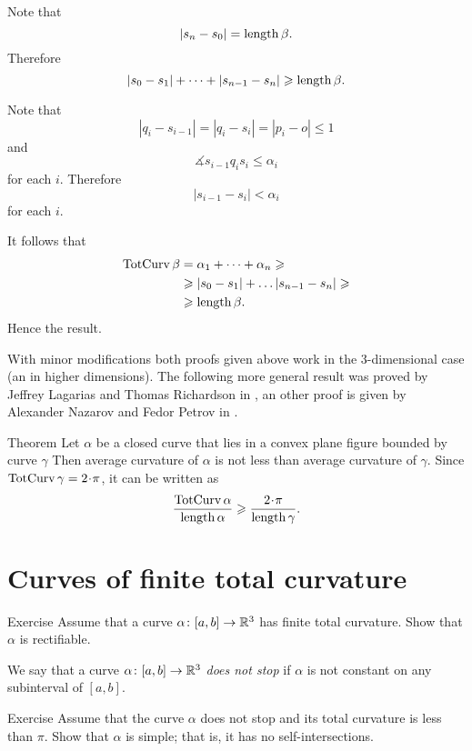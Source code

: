 Note that 
\[|s_n-s_0|=\mathop{\rm length}\nolimits \beta.\]
Therefore 
\[|s_0-s_1|+\dots+|s_{n-1}-s_n|\geqslant \mathop{\rm length}\nolimits \beta.\]

Note that 
\[|q_i-s_{i-1}|=|q_i-s_i|=|p_i-o|\le 1\]
and
\[\measuredangle s_{i-1}q_is_i\le \alpha_i\]
for each $i$.
Therefore 
\[|s_{i-1}-s_i|<\alpha_i\]
for each $i$.

It follows that
\begin{align*}
\mathop{\rm TotCurv}\nolimits \beta
&=\alpha_1+\dots+\alpha_n\geqslant
\\
&\geqslant |s_{0}-s_1|+\dots |s_{n-1}-s_n|\geqslant 
\\
&\geqslant\mathop{\rm length}\nolimits \beta.
\end{align*}
Hence the result.
\qeds

With minor modifications both proofs given above work in the 3-dimensional case (an in higher dimensions).
The following more general result was proved by Jeffrey Lagarias and Thomas Richardson in \cite{lagarias-richardso}, an other proof is given by Alexander Nazarov and Fedor Petrov in \cite{nazarov-petrov}.

\begin{thm}{Theorem}
Let $\alpha$ be a closed curve that lies in a convex plane figure bounded by curve $\gamma$
Then average curvature of $\alpha$ is not less than average curvature of $\gamma$.
Since  $\tc\gamma=2\cdot\pi$, it can be written as
\[\frac{\tc\alpha}{\length\alpha}\ge \frac{2\cdot\pi}{\length\gamma}.\]

\end{thm}



\section{Curves of finite total curvature}

\begin{thm}{Exercise} 
Assume that a curve $\alpha\colon[a,b]\to\mathbb{R}^3$ has finite total curvature.
 Show that $\alpha$ is rectifiable.
\end{thm}

We say that a curve $\alpha\colon[a,b]\to\mathbb{R}^3$ \emph{does not stop} if $\alpha$ is not constant on any subinterval of $[a,b]$. 

\begin{thm}{Exercise} 
Assume that the curve $\alpha$ does not stop and its total curvature is less than $\pi$.
Show that $\alpha$ is simple; that is, it has no self-intersections.
\end{thm}

